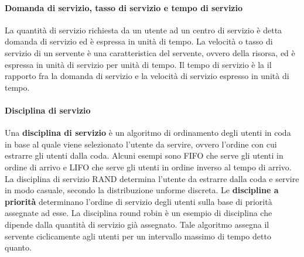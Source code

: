 \paragraph{Domanda di servizio, tasso di servizio e tempo di servizio}
La quantità di servizio richiesta da un utente ad un centro di servizio è detta
domanda di servizio ed è espressa in unità di tempo. La velocità o tasso di servizio di un servente è una caratteristica del servente, ovvero della risorsa, ed è espressa in unità di servizio per unità di tempo. Il tempo di servizio è la il rapporto fra la domanda di servizio e la velocità di servizio espresso in unità di tempo.
\paragraph{Disciplina di servizio}
Una \textbf{disciplina di servizio} è un algoritmo di ordinamento degli utenti in coda in base al quale viene selezionato l'utente da servire, ovvero l’ordine con cui estrarre gli utenti dalla coda. Alcuni esempi sono FIFO che serve gli utenti in ordine di arrivo  e LIFO che serve gli utenti in ordine inverso al tempo di
arrivo. La disciplina di servizio RAND determina l’utente da estrarre dalla coda e servire
in modo casuale, secondo la distribuzione unforme discreta. Le \textbf{discipline a priorità} determinano l’ordine di servizio degli utenti sulla base di priorità assegnate ad esse. La disciplina round robin è un esempio di disciplina che dipende dalla quantità di servizio già assegnato. Tale algoritmo assegna il servente ciclicamente agli utenti per un intervallo massimo di tempo detto quanto.

